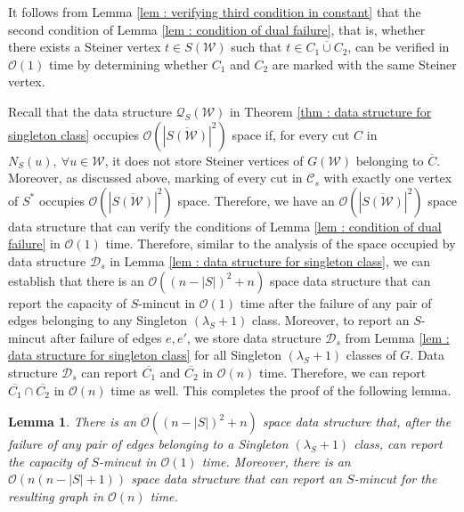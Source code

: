 \documentclass[letterpaper,11pt]{article}
\newtheorem{lemma}{Lemma}[]
\begin{document}
It follows from Lemma \ref{lem : verifying third condition in constant} that the second condition of Lemma \ref{lem : condition of dual failure}, that is, whether there exists a Steiner vertex $t\in S({\mathcal W})$ such that $t\in \overline{C_1\cup C_2}$, can be verified in ${\mathcal O}(1)$ time by determining whether $C_1$ and $C_2$ are marked with the same Steiner vertex.

Recall that the data structure ${\mathcal Q}_S({\mathcal W})$ in Theorem \ref{thm : data structure for singleton class} occupies ${\mathcal O}(|\overline{S({\mathcal W})}|^2)$ space if, for every cut $C$ in $N_S(u),~\forall u\in {\mathcal W}$, it does not store Steiner vertices of $G({\mathcal W})$ belonging to $\overline{C}$. Moreover, as discussed above, marking of every cut in ${\mathcal C}_s$ with exactly one vertex of $S^*$ occupies ${\mathcal O}(|\overline{S({\mathcal W})}|^2)$ space. Therefore, we have an ${\mathcal O}(|\overline{S({\mathcal W})}|^2)$ space data structure that can verify the conditions of Lemma \ref{lem : condition of dual failure} in ${\mathcal O}(1)$ time. Therefore, similar to the analysis of the space occupied by data structure ${\mathcal D}_s$ in Lemma \ref{lem : data structure for singleton class}, we can establish that there is an ${\mathcal O}((n-|S|)^2+n)$ space data structure that can report the capacity of $S$-mincut in ${\mathcal O}(1)$ time after the failure of any pair of edges belonging to any Singleton $(\lambda_S+1)$ class.
Moreover, to report an $S$-mincut after failure of edges $e,e'$, we store data structure ${\mathcal D}_s$ from Lemma \ref{lem : data structure for singleton class} for all Singleton $(\lambda_S+1)$ classes of $G$. Data structure ${\mathcal D}_s$ can report $\overline{C_1}$ and $\overline{C_2}$ in ${\mathcal O}(n)$ time. Therefore, we can report $\overline{C_1}\cap \overline{C_2}$ in ${\mathcal O}(n)$ time as well. This completes the proof of the following lemma.



















    
    






\begin{lemma} \label{lem : singleton class final lemma}
    There is an ${\mathcal O}((n-|S|)^2+n)$ space data structure that, after the failure of any pair of edges belonging to a Singleton $(\lambda_S+1)$ class, can report the capacity of $S$-mincut in ${\mathcal O}(1)$ time. Moreover, there is an ${\mathcal O}(n(n-|S|+1))$ space data structure that can report an $S$-mincut for the resulting graph in ${\mathcal O}(n)$ time.
\end{lemma}
\end{document}
